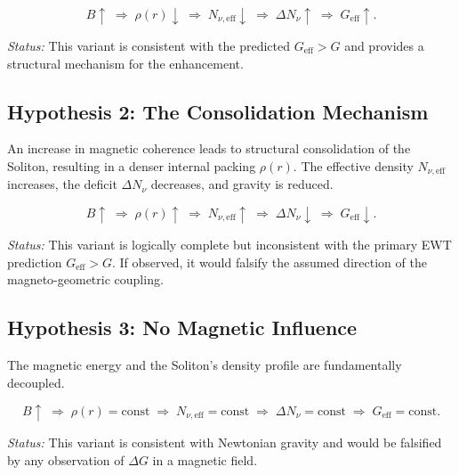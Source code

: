 \documentclass[10pt,a4paper]{article}
\begin{document}
\begin{equation}
	B \uparrow
	\;\Longrightarrow\;
	\rho(r) \downarrow
	\;\Longrightarrow\;
	N_{\nu,\text{eff}} \downarrow
	\;\Longrightarrow\;
	\Delta N_\nu \uparrow
	\;\Longrightarrow\;
	G_{\text{eff}} \uparrow .
	\label{eq:hyp_1_gravity}
\end{equation}

\emph{Status:} This variant is consistent with the predicted \(G_{\text{eff}} > G\) and provides a structural mechanism for the enhancement.

\subsection{Hypothesis 2: The Consolidation Mechanism}
\label{sec:hyp_2_consolidation}

An increase in magnetic coherence leads to structural consolidation of the Soliton, resulting in a denser internal packing \(\rho(r)\). The effective density \(N_{\nu,\text{eff}}\) increases, the deficit \(\Delta N_\nu\) decreases, and gravity is reduced.

\begin{equation}
	B \uparrow
	\;\Longrightarrow\;
	\rho(r) \uparrow
	\;\Longrightarrow\;
	N_{\nu,\text{eff}} \uparrow
	\;\Longrightarrow\;
	\Delta N_\nu \downarrow
	\;\Longrightarrow\;
	G_{\text{eff}} \downarrow .
	\label{eq:hyp_2_gravity}
\end{equation}

\emph{Status:} This variant is logically complete but inconsistent with the primary EWT prediction \(G_{\text{eff}} > G\). If observed, it would falsify the assumed direction of the magneto-geometric coupling.

\subsection{Hypothesis 3: No Magnetic Influence}
\label{sec:hyp_3_no_influence}

The magnetic energy and the Soliton's density profile are fundamentally decoupled.

\begin{equation}
	B \uparrow
	\;\Longrightarrow\;
	\rho(r) = \text{const}
	\;\Longrightarrow\;
	N_{\nu,\text{eff}} = \text{const}
	\;\Longrightarrow\;
	\Delta N_\nu = \text{const}
	\;\Longrightarrow\;
	G_{\text{eff}} = \text{const} .
	\label{eq:hyp_3_gravity}
\end{equation}

\emph{Status:} This variant is consistent with Newtonian gravity and would be falsified by any observation of \(\Delta G\) in a magnetic field.
\end{document}

